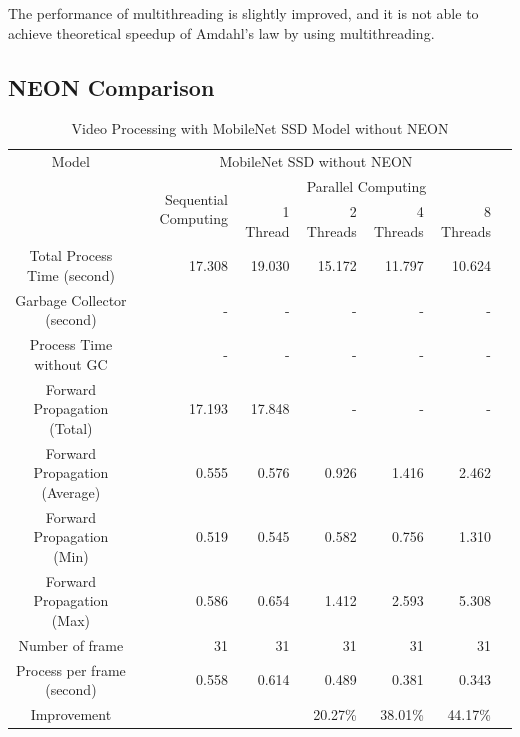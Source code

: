             The performance of multithreading is slightly improved,
            and it is not able to achieve theoretical speedup of Amdahl's law by using multithreading.

        \subsection{NEON Comparison}
        \begin{table}[!htp]\centering
            \scriptsize
            \begin{tabular}{lrrrrrrr}\toprule
                \multicolumn{2}{c}{Model} &\multicolumn{5}{c}{MobileNet SSD without NEON} \\\cmidrule{1-7}
                \multicolumn{2}{c}{\multirow{2}{*}{}} &\multirow{2}{*}{Sequential Computing} &\multicolumn{4}{c}{Parallel Computing} \\\cmidrule{4-7}
                & & &1 Thread &2 Threads &4 Threads &8 Threads \\\midrule
                \multicolumn{2}{c}{Total Process Time (second)} &17.308 &19.030 &15.172 &11.797 &10.624 \\
                \multicolumn{2}{c}{Garbage Collector (second)} &- &- &- &- &- \\
                \multicolumn{2}{c}{Process Time without GC} &- &- &- &- &- \\
                \multicolumn{2}{c}{Forward Propagation (Total)} &17.193 &17.848 &- &- &- \\
                \multicolumn{2}{c}{Forward Propagation (Average)} &0.555 &0.576 &0.926 &1.416 &2.462 \\
                \multicolumn{2}{c}{Forward Propagation (Min)} &0.519 &0.545 &0.582 &0.756 &1.310 \\
                \multicolumn{2}{c}{Forward Propagation (Max)} &0.586 &0.654 &1.412 &2.593 &5.308 \\
                \multicolumn{2}{c}{Number of frame} &31 &31 &31 &31 &31 \\
                \multicolumn{2}{c}{Process per frame (second)} &0.558 &0.614 &0.489 &0.381 &0.343 \\
                \multicolumn{2}{c}{Improvement} & & &20.27\% &38.01\% &44.17\% \\
                \bottomrule
            \end{tabular}

            \caption{Video Processing with MobileNet SSD Model without NEON}\label{ssd:non-neon-performance}
        \end{table}

